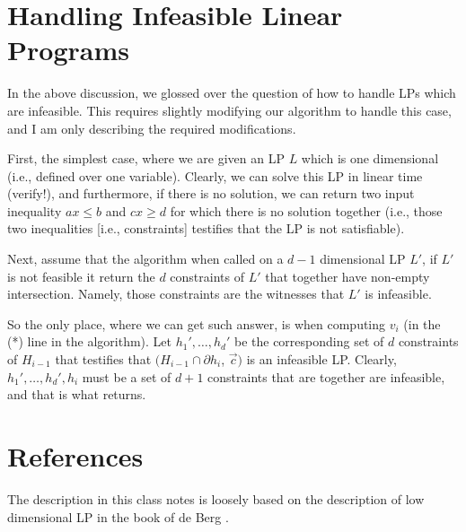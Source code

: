 \section{Handling Infeasible Linear Programs}

In the above discussion, we glossed over the question of how to handle
LPs which are infeasible. This requires slightly modifying our
algorithm to handle this case, and I am only describing the required
modifications. 

First, the simplest case, where we are given an LP $L$ which is one
dimensional (i.e., defined over one variable). Clearly, we can solve
this LP in linear time (verify!), and furthermore, if there is no
solution, we can return two input inequality $ax \leq b$ and $c x \geq
d$ for which there is no solution together (i.e., those two
inequalities [i.e., constraints] testifies that the LP is not
satisfiable). 

Next, assume that the algorithm \SolveLP{} when called on a $d-1$
dimensional LP $L'$, if $L'$ is not feasible it return the $d$
constraints of $L'$ that together have non-empty intersection. Namely,
those constraints are the witnesses that $L'$ is infeasible.

So the only place, where we can get such answer, is when computing
$v_i$ (in the (*) line in the algorithm). Let $h_1',\ldots, h_d'$ be
the corresponding set of $d$ constraints of $H_{i-1}$ that testifies
that $(H_{i-1}\cap\partial h_{i}$, $\overrightarrow{c})$ is an
infeasible LP. Clearly, $h_1', \ldots, h_d', h_i$ must be a set of
$d+1$ constraints that are together are infeasible, and that is what
\SolveLP{} returns.

\section{References}

The description in this class notes is loosely based on the description
of low dimensional LP in the book of de Berg \etal{}
\cite{bcko-cgaa-08}.


\ChapterEnd{}

